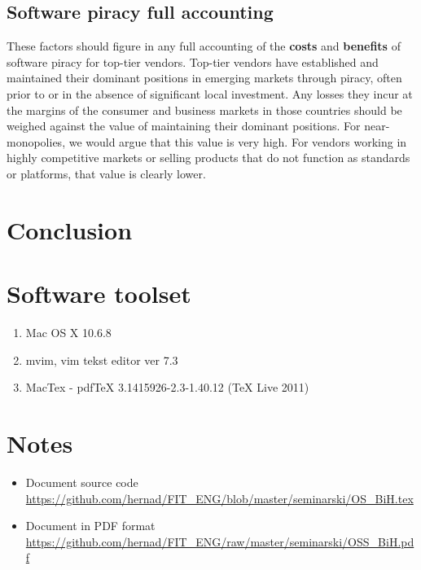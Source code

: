 \documentclass[times, utf8, seminar]{fit}
\begin{document}
\section{Software piracy full accounting}

These factors should figure in any full accounting of the \textbf{costs} and \textbf{benefits} of software piracy for top-tier vendors. Top-tier vendors have established and maintained their dominant positions in emerging markets through piracy, often prior to or in the absence of significant local investment. Any losses they incur at the margins of the consumer and business markets in those countries should be weighed against the value of maintaining their dominant positions. For near-monopolies, we would argue that this value is very high. For vendors working in highly competitive markets or selling products that do not function as standards or platforms, that value is clearly lower.\citep{mediapiracy}


\chapter{Conclusion}




\appendix

\chapter{Software toolset}
\begin{enumerate}
  \item Mac OS X 10.6.8
  \item mvim, vim tekst editor ver 7.3
  \item MacTex - pdfTeX 3.1415926-2.3-1.40.12 (TeX Live 2011)
\end{enumerate}

\chapter{Notes}

\begin{itemize}
  \item Document source code \url{https://github.com/hernad/FIT_ENG/blob/master/seminarski/OS_BiH.tex}
  \item Document in PDF format \url{https://github.com/hernad/FIT_ENG/raw/master/seminarski/OSS_BiH.pdf}
\end{itemize}
\end{document}
